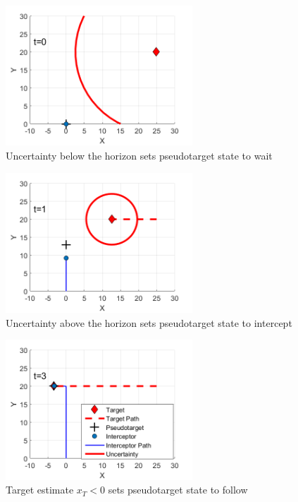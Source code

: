 \documentclass[conference]{IEEEtran}
\begin{document}
\begin{figure}[H]
	\centering
	\includegraphics[width=7cm]{step1}
	\caption{Uncertainty below the horizon sets pseudotarget state to wait}
	\label{fig:wait}
\end{figure}

\begin{figure}[H]
	\centering
	\includegraphics[width=7cm]{step2}
	\caption{Uncertainty above the horizon sets pseudotarget state to intercept}
	\label{fig:intercept}
\end{figure}

\begin{figure}[H]
	\centering
	\includegraphics[width=7cm]{step3}
	\caption{Target estimate $x_T < 0$ sets pseudotarget state to follow}
	\label{fig:follow}
\end{figure}

\end{document}
